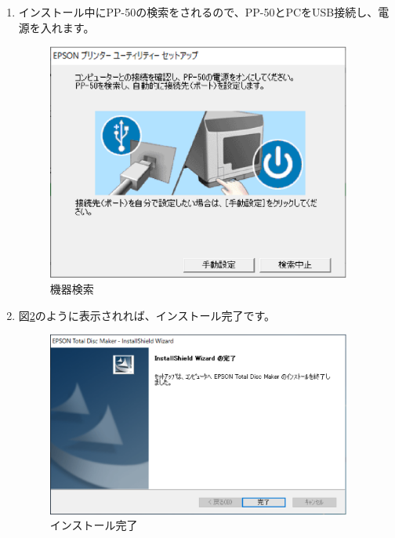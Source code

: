 \documentclass[11pt,a4paper]{jsarticle}
\begin{document}
\begin{enumerate}
                        \item インストール中にPP-50の検索をされるので、PP-50とPCをUSB接続し、電源を入れます。
                        \begin{figure}[H]
                            \begin{center}
                            \includegraphics[width=10.0cm]{./image/tdm05.eps}
                            \caption{機器検索}
                            \label{fig:tdm05}
                            \end{center}
                        \end{figure}
                        \item 図\ref{fig:tdm06}のように表示されれば、インストール完了です。
                        \begin{figure}[H]
                            \begin{center}
                            \includegraphics[width=10.0cm]{./image/tdm06.eps}
                            \caption{インストール完了}
                            \label{fig:tdm06}
                            \end{center}
                        \end{figure}
                    \end{enumerate}
                    
\end{document}
